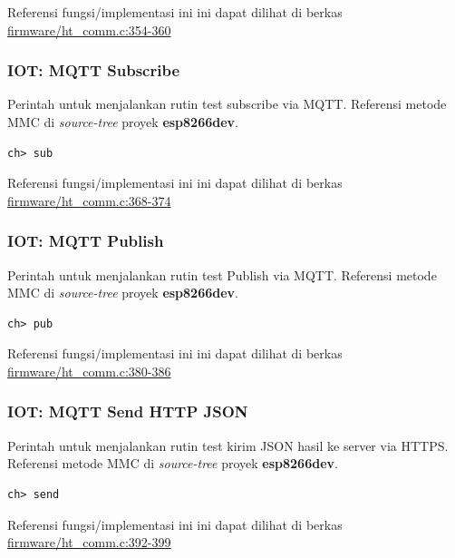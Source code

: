 \documentclass[12pt,]{article}
\begin{document}
	Referensi fungsi/implementasi ini ini dapat dilihat di berkas
	\href{https://github.com/VibrasticLab/pikoakustik/blob/stm32f401re_3pin/firmware/ht_comm.c#L354-L360}{firmware/ht\_comm.c:354-360}
	
	\subsubsection{IOT: MQTT Subscribe}
	Perintah untuk menjalankan rutin test subscribe via MQTT.
	Referensi metode MMC di \textit{source-tree} proyek \textbf{esp8266dev}.
	\begin{verbatim}
ch> sub
	\end{verbatim}
	
	Referensi fungsi/implementasi ini ini dapat dilihat di berkas
	\href{https://github.com/VibrasticLab/pikoakustik/blob/stm32f401re_3pin/firmware/ht_comm.c#L368-L374}{firmware/ht\_comm.c:368-374}
	
	\subsubsection{IOT: MQTT Publish}
	Perintah untuk menjalankan rutin test Publish via MQTT.
	Referensi metode MMC di \textit{source-tree} proyek \textbf{esp8266dev}.
	\begin{verbatim}
ch> pub
	\end{verbatim}
	
	Referensi fungsi/implementasi ini ini dapat dilihat di berkas
	\href{https://github.com/VibrasticLab/pikoakustik/blob/stm32f401re_3pin/firmware/ht_comm.c#L380-L386}{firmware/ht\_comm.c:380-386}
	
	\newpage
	\subsubsection{IOT: MQTT Send HTTP JSON}
	Perintah untuk menjalankan rutin test kirim JSON hasil ke server via HTTPS.
	Referensi metode MMC di \textit{source-tree} proyek \textbf{esp8266dev}.
	\begin{verbatim}
ch> send
	\end{verbatim}
	
	Referensi fungsi/implementasi ini ini dapat dilihat di berkas
	\href{https://github.com/VibrasticLab/pikoakustik/blob/stm32f401re_3pin/firmware/ht_comm.c#L392-L399}{firmware/ht\_comm.c:392-399}
	
\end{document}
